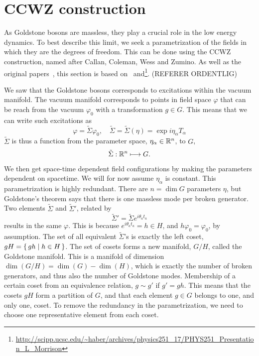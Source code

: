 \section{CCWZ construction}
\label{seciton:ccwz construction}

As Goldstone bosons are massless, they play a crucial role in the low energy dynamics.
To best describe this limit, we seek a parametrization of the fields in which they are the degrees of freedom.
This can be done using the CCWZ construction, named after Callan, Coleman, Wess and Zumino.
As well as the original papers~\cite{Structure_of_phen_1,Structure_of_phen_2}, this section is based on~\cite{weinberg_1996_vol2,The_composite_NG_Higgs,effective_FT_with_NG_modes} and\footnote{\url{http://scipp.ucsc.edu/~haber/archives/physics251_17/PHYS251_Presentation_L_Morrison}}. (REFERER ORDENTLIG)


We saw that the Goldstone bosons corresponds to excitations within the vacuum manifold.
The vacuum manifold corresponds to points in field space $\varphi$ that can be reach from the vacuum $\varphi_0$ with a transformation $g \in G$.
This means that we can write such excitations as
\begin{equation}
    \varphi = \tilde\Sigma \varphi_0, \quad \tilde \Sigma = \tilde \Sigma(\eta) = \exp{i \eta_\alpha T_\alpha}
\end{equation}
$\tilde \Sigma$ is thus a function from the parameter space, $\eta_\alpha \in \mathbb{R}^n$, to $G$,
\begin{align}
    \tilde \Sigma: \mathbb{R}^n \longmapsto G.
\end{align}
We then get space-time dependent field configurations by making the parameters dependent on spacetime.
We will for now assume $\eta_\alpha$ is constant.
This parametrization is highly redundant.
There are $n = \dim G$ parameters $\eta$, but Goldstone's theorem says that there is one massless mode per broken generator.
Two elements $\tilde\Sigma$ and $\tilde\Sigma'$, related by
\begin{equation}
    \tilde \Sigma' = \tilde\Sigma e^{i \theta_a t_a}
\end{equation}
results in the same $\varphi$.
This is because  $e^{i \theta_a t_a} = h \in H$, and $h \varphi_0 = \varphi_0$, by assumption.
The set of all equivalent $\tilde \Sigma$'s is exactly the left coset, $gH = \left\{\, gh \mid  h \in H \,\right\}$.
The set of cosets forms a new manifold, $G / H$, called the Goldstone manifold.
This is a manifold of dimension $\dim(G/H) = \dim(G) - \dim(H)$, which is exactly the number of broken generators, and thus also the number of Goldstone modes.
Membership of a certain coset from an equivalence relation, $g \sim g'$ if $g' = gh$.
This means that the cosets $gH$ form a partition of $G$, and that each element $g \in G$ belongs to one, and only one, coset.
To remove the redundancy in the parametrization, we need to choose one representative element from each coset.

